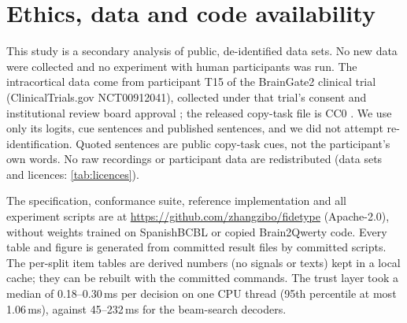 \section*{Ethics, data and code availability}
\label{sec:ethics}
\label{sec:availability}

This study is a secondary analysis of public, de-identified data sets. No new data were collected and no experiment with human participants was run. The intracortical data come from participant T15 of the BrainGate2 clinical trial (ClinicalTrials.gov NCT00912041), collected under that trial's consent and institutional review board approval \citep{card2024accurate}; the released copy-task file is CC0 \citep{card2025data}. We use only its logits, cue sentences and published sentences, and we did not attempt re-identification. Quoted sentences are public copy-task cues, not the participant's own words.  No raw recordings or participant data are redistributed (data sets and licences: \cref{tab:licences}).

The \nts{} specification, conformance suite, reference implementation and all experiment scripts are at \url{https://github.com/zhangzibo/fidetype} (Apache-2.0), without weights trained on SpanishBCBL or copied Brain2Qwerty code. Every table and figure is generated from committed result files by committed scripts. The per-split item tables are derived numbers (no signals or texts) kept in a local cache; they can be rebuilt with the committed commands.  The trust layer took a median of 0.18--0.30\,ms per decision on one CPU thread (95th percentile at most 1.06\,ms), against 45--232\,ms for the beam-search decoders.
